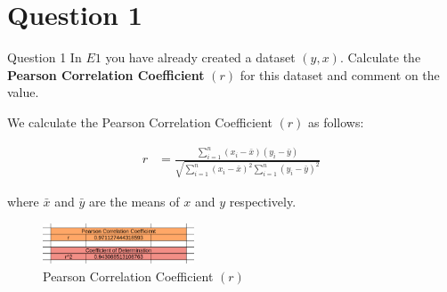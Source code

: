 \section*{Question 1}

\begin{custombox}[label={box:Q1}]{Question 1}
	In $E1$ you have already created a dataset $(y, x)$. Calculate the \textbf{Pearson Correlation Coefficient} $(r)$ for this dataset and comment on the value.
\end{custombox}

We calculate the Pearson Correlation Coefficient $(r)$ as follows:

\begin{align}
	r &= \frac{\sum_{i=1}^{n} (x_i - \bar{x})(y_i - \bar{y})}{\sqrt{\sum_{i=1}^{n} (x_i - \bar{x})^2 \sum_{i=1}^{n} (y_i - \bar{y})^2}}
\end{align}

where $\bar{x}$ and $\bar{y}$ are the means of $x$ and $y$ respectively.


\begin{figure}[H]
	\centering
	\includegraphics[width=0.4\textwidth]{Images/Q1.png}
	\caption{Pearson Correlation Coefficient $(r)$}
	\label{fig:Q1}
\end{figure}

\clearpage




